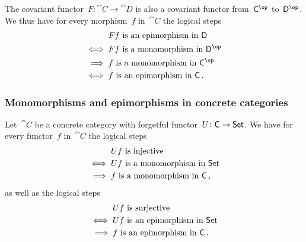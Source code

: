 The covariant functor~$F \colon \cat{C} \to \cat{D}$ is also a covariant
functor from~$\cat{C}^{\op}$ to~$\cat{D}^{\op}$.
We thus have for every morphism~$f$ in~$\cat{C}$ the logical steps
\begin{align*}
	{}&
	\text{$F f$ is an epimorphism in~$\cat{D}$}
	\\
	\iff{}&
	\text{$F f$ is a monomorphism in~$\cat{D}^{\op}$}
	\\
	\implies{}&
	\text{$f$ is a monomorphism in~$\cat{C}^{\op}$}
	\\
	\iff{}&
	\text{$f$ is an epimorphism in~$\cat{C}$} \,.
\end{align*}



\subsubsection*{Monomorphisms and epimorphisms in concrete categories}

Let~$\cat{C}$ be a concrete category with forgetful functor~$U \colon \mathsf{C} \to \mathsf{Set}$.
We have for every functor~$f$ in~$\cat{C}$ the logical steps
\begin{align*}
	{}&
	\text{$U f$ is injective}
	\\
	\iff{}&
	\text{$U f$ is a monomorphism in~$\mathsf{Set}$}
	\\
	\implies{}&
	\text{$f$ is a monomorphism in~$\mathsf{C}$} \,,
\end{align*}
as well as the logical steps
\begin{align*}
	{}&
	\text{$U f$ is surjective}
	\\
	\iff{}&
	\text{$U f$ is an epimorphism in~$\mathsf{Set}$}
	\\
	\implies{}&
	\text{$f$ is an epimorphism in~$\mathsf{C}$} \,.
\end{align*}
